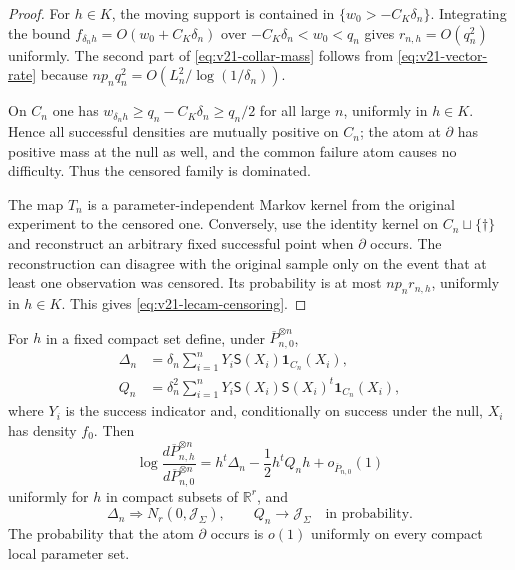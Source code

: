 \begin{proof}
For $h\in K$, the moving support is contained in
$\{w_0>-C_K\delta_n\}$.  Integrating the bound
$f_{\delta_nh}=O(w_0+C_K\delta_n)$ over
$-C_K\delta_n<w_0<q_n$ gives $r_{n,h}=O(q_n^2)$ uniformly.  The second
part of \eqref{eq:v21-collar-mass} follows from
\eqref{eq:v21-vector-rate} because
$np_nq_n^2=O(L_n^2/\log(1/\delta_n))$.

On $C_n$ one has
$w_{\delta_nh}\ge q_n-C_K\delta_n\ge q_n/2$ for all large $n$, uniformly
in $h\in K$.  Hence all successful densities are mutually positive on
$C_n$; the atom at $\partial$ has positive mass at the null as well, and
the common failure atom causes no difficulty.  Thus the censored family is
dominated.

The map $T_n$ is a parameter-independent Markov kernel from the original
experiment to the censored one.  Conversely, use the identity kernel on
$C_n\sqcup\{\dagger\}$ and reconstruct an arbitrary fixed successful point
when $\partial$ occurs.  The reconstruction can disagree with the original
sample only on the event that at least one observation was censored.  Its
probability is at most $np_nr_{n,h}$, uniformly in $h\in K$.  This gives
\eqref{eq:v21-lecam-censoring}.
\end{proof}

\begin{lemma}
\label{lem:v21-dominated-lan}
For $h$ in a fixed compact set define, under
$\overline P_{n,0}^{\otimes n}$,
\begin{align}
 \Delta_n&=\delta_n\sum_{i=1}^nY_i
 \mathsf S(X_i)\mathbf1_{C_n}(X_i),
                                      \label{eq:v21-delta}\\
 Q_n&=\delta_n^2\sum_{i=1}^nY_i
 \mathsf S(X_i)\mathsf S(X_i)^t\mathbf1_{C_n}(X_i),
                                      \label{eq:v21-Q}
\end{align}
where $Y_i$ is the success indicator and, conditionally on success under the
null, $X_i$ has density $f_0$.  Then
\begin{equation}\label{eq:v21-dominated-expansion}
 \log\frac{d\overline P_{n,h}^{\otimes n}}
          {d\overline P_{n,0}^{\otimes n}}
 =h^t\Delta_n-\frac12h^tQ_nh+o_{\overline P_{n,0}}(1)
\end{equation}
uniformly for $h$ in compact subsets of $\mathbb R^r$, and
\begin{equation}\label{eq:v21-central-limits}
 \Delta_n\Rightarrow N_r(0,\mathcal J_\Sigma),
 \qquad Q_n\longrightarrow\mathcal J_\Sigma
 \quad\text{in probability}.
\end{equation}
The probability that the atom $\partial$ occurs is $o(1)$ uniformly on every
compact local parameter set.
\end{lemma}

